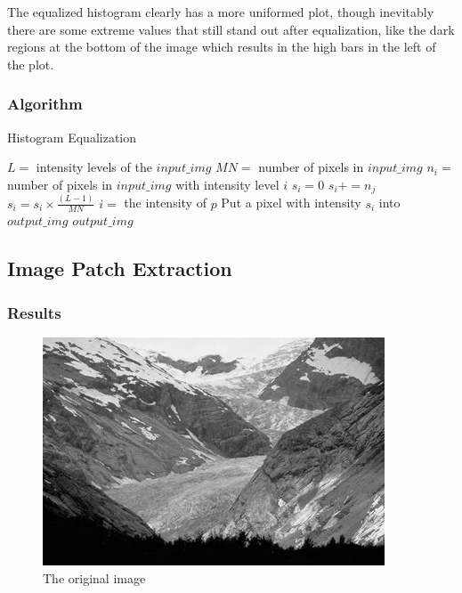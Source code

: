 \documentclass{article}
\begin{document}
The equalized histogram clearly has a more uniformed plot, though inevitably there are some extreme values that still stand out after equalization, like the dark regions at the bottom of the image which results in the high bars in the left of the plot.

\subsubsection{Algorithm}

\begin{algorithm}[H]
\centering
\caption{Histogram Equalization}
  \begin{algorithmic}[1]
     \State $L = $ intensity levels of the $input\_img$
     \State $MN = $ number of pixels in $input\_img$
      	\State $n_i = $ number of pixels in $input\_img$ with intensity level $i$
      	\State $s_i = 0$
      		\State $s_i += n_j$
      	\EndFor
      	\State $s_i = s_i \times \frac{(L - 1)}{MN}$
      \EndFor
      	\State $i = $ the intensity of $p$
      	\State Put a pixel with intensity $s_i$ into $output\_img$
      \EndFor
      \State \Return $output\_img$
    \EndFunction
  \end{algorithmic}
\end{algorithm}


\subsection{Image Patch Extraction}

\subsubsection{Results}
\begin{figure}[H]
	\centering
	\includegraphics[width=288pt]{../img/02.png}
	\caption{The original image}
\end{figure}
\end{document}
